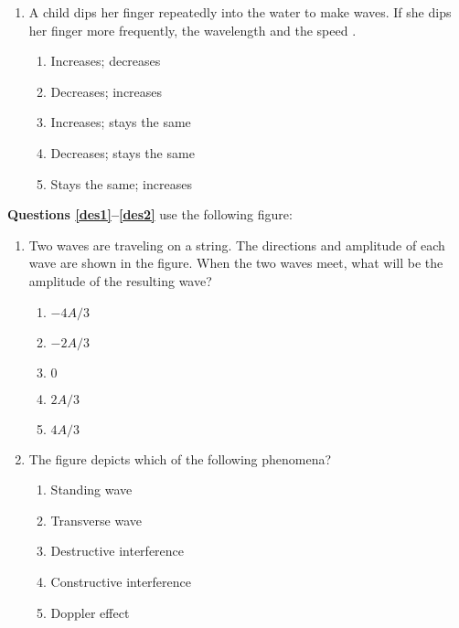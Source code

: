 \documentclass{../../../oss-apphys}
\begin{document}
\begin{multicols}{2}
\begin{enumerate}[leftmargin=18pt]
  \item A child dips her finger repeatedly into the water to make waves. If she
    dips her finger more frequently, the wavelength \underline{\hspace{.2in}}
    and the speed \underline{\hspace{.2in}}.
    \begin{enumerate}[noitemsep,topsep=0pt,leftmargin=18pt,label=(\Alph*)]
    \item Increases; decreases
    \item Decreases; increases
    \item Increases; stays the same
    \item Decreases; stays the same
    \item Stays the same; increases
    \end{enumerate}
  \end{enumerate}
  \columnbreak
  
  \textbf{Questions \ref{des1}--\ref{des2}} use the following figure:
  \begin{center}
  \end{center}
  \begin{enumerate}[leftmargin=18pt,resume]
  \item Two waves are traveling on a string. The directions and amplitude of
    each wave are shown in the figure. When the two waves meet, what
    will be the amplitude of the resulting wave?
    \label{des1}
    \begin{enumerate}[noitemsep,topsep=0pt,leftmargin=18pt,label=(\Alph*)]
    \item $-4A/3$
    \item $-2A/3$
    \item $0$
    \item $2A/3$
    \item $4A/3$
    \end{enumerate}
    
  \item The figure depicts which of the following phenomena?
    \begin{enumerate}[noitemsep,topsep=0pt,leftmargin=18pt,label=(\Alph*)]
    \item Standing wave
    \item Transverse wave
    \item Destructive interference
    \item Constructive interference
    \item Doppler effect
    \end{enumerate}
    

\end{enumerate}
\end{multicols}
\end{document}
